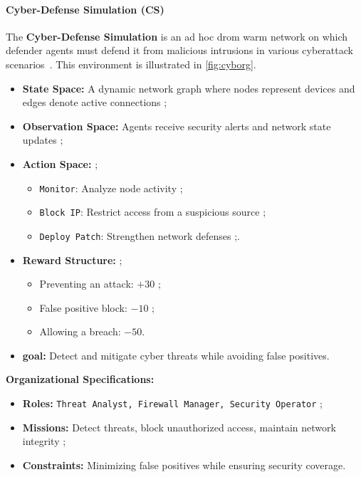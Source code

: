\documentclass[pdflatex,sn-mathphys-num]{sn-jnl}%
\theoremstyle{thmstyleone}%
\theoremstyle{thmstyletwo}%
\theoremstyle{thmstylethree}%
\begin{document}
\paragraph{Cyber-Defense Simulation (CS)}
The \textbf{Cyber-Defense Simulation} is an ad hoc drom warm network on which defender agents must defend it from malicious intrusions in various cyberattack scenarios~\cite{Maxwell2021}. This environment is illustrated in \autoref{fig:cyborg}.

\begin{itemize}
    \item \textbf{State Space:} A dynamic network graph where nodes represent devices and edges denote active connections ;
    \item \textbf{Observation Space:} Agents receive security alerts and network state updates ;
    \item \textbf{Action Space:}  ;
          \begin{itemize}
              \item \texttt{Monitor}: Analyze node activity ;
              \item \texttt{Block IP}: Restrict access from a suspicious source ;
              \item \texttt{Deploy Patch}: Strengthen network defenses ;.
          \end{itemize}
    \item \textbf{Reward Structure:} ;
          \begin{itemize}
              \item Preventing an attack: $+30$ ;
              \item False positive block: $-10$ ;
              \item Allowing a breach: $-50$.
          \end{itemize}
    \item \textbf{goal:} Detect and mitigate cyber threats while avoiding false positives.
\end{itemize}

\textbf{Organizational Specifications:}
\begin{itemize}
    \item \textbf{Roles:} \texttt{Threat Analyst, Firewall Manager, Security Operator} ;
    \item \textbf{Missions:} Detect threats, block unauthorized access, maintain network integrity ;
    \item \textbf{Constraints:} Minimizing false positives while ensuring security coverage.
\end{itemize}
\end{document}
